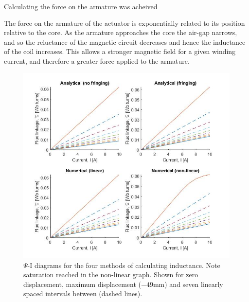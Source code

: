 \documentclass[a4paper]{IEEEtran}
\begin{document}
    Calculating the force on the armature was acheived 

    The force on the armature of the actuator is exponentially related to its position relative to the core. As the armature approaches the core the air-gap narrows, and so the reluctance of the magnetic circuit decreases and hence the inductance of the coil increases. This allows a stronger magnetic field for a given winding current, and therefore a greater force applied to the armature.



    \begin{figure}[ht]
        \includegraphics[width = \linewidth]{psi-I-diagrams.jpg}
        \caption{$\Psi$-I diagrams for the four methods of calculating inductance. Note saturation reached in the non-linear graph. Shown for zero displacement, maximum displacement ($-49$mm) and seven linearly spaced intervals between (dashed lines).}
        \label{psi-eye} 
    \end{figure}
\end{document}
